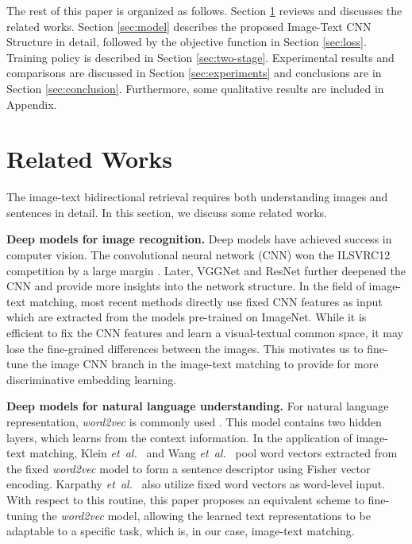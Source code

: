 \documentclass[10pt,final,journal]{IEEEtran}
\newcommand{\etal}{\mbox{\emph{et al.\ }}}
\begin{document}
The rest of this paper is organized as follows. Section \ref{sec:related work} reviews and discusses the related works. Section \ref{sec:model} describes the proposed Image-Text CNN Structure in detail, followed by the objective function in Section \ref{sec:loss}. Training policy is described in Section \ref{sec:two-stage}. Experimental results and comparisons are discussed in Section \ref{sec:experiments} and conclusions are in Section \ref{sec:conclusion}. Furthermore, some qualitative results are included in Appendix.



\section{Related Works} \label{sec:related work}
The image-text bidirectional retrieval requires both understanding images and sentences in detail. In this section, we discuss some related works. 

\textbf{Deep models for image recognition.}
Deep models have achieved success in computer vision. The convolutional neural network (CNN) won the ILSVRC12 competition \cite{russakovsky2015imagenet} by a large margin \cite{krizhevsky2012imagenet}. Later, VGGNet \cite{simonyan2014very} and ResNet \cite{he2016deep} further deepened the CNN and provide more insights into the network structure. 
In the field of image-text matching, most recent methods directly use fixed CNN features \cite{mao2014deep,klein2015associating,lin2016leveraging,lev2016rnn,wang2016learning,nam2016dual,huang2016instance,niu2017hierarchical,wang2017learning,reed2016learning} as input which are extracted from the models pre-trained on ImageNet. 
While it is efficient to fix the CNN features and learn a visual-textual common space, it may lose the fine-grained differences between the images. This motivates us to fine-tune the image CNN branch in the image-text matching to provide for more discriminative embedding learning.  

\textbf{Deep models for natural language understanding.} For natural language representation, \emph{word2vec}  \cite{mikolov2013efficient} is commonly used \cite{klein2015associating,karpathy2015deep,wang2016learning,niu2017hierarchical,hu2018twitter100k}. This model contains two hidden layers, which learns from the context information. In the application of image-text matching, Klein \etal \cite{klein2015associating} and Wang \etal \cite{wang2016learning} pool word vectors extracted from the fixed \emph{word2vec} model to form a sentence descriptor using Fisher vector encoding. Karpathy \etal \cite{karpathy2015deep} also utilize fixed word vectors as word-level input. With respect to this routine, this paper proposes an equivalent scheme to fine-tuning the \emph{word2vec} model, allowing the learned text representations to be adaptable to a specific task, which is, in our case, image-text matching.
\end{document}
